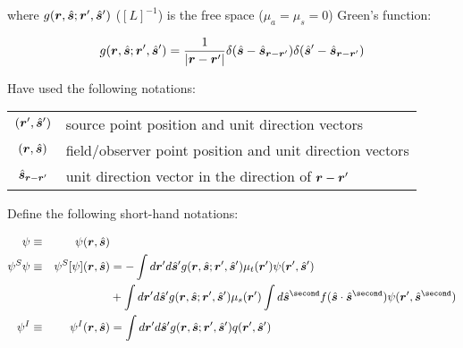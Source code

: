 \documentclass [12pt,letterpaper]{article}
\renewcommand{\vec}{\vectorsym}
\begin{document}
where $g(\vec{r},\hat{\vec{s}};\vec{r}^\prime,\hat{\vec{s}}^\prime)$ ($[L]^{-1}$)
 is the free space ($\mu_a=\mu_s=0$) Green's function:

\begin{equation}\label{eq:2dGF}\begin{split}
g(\vec{r},\hat{\vec{s}};\vec{r}^\prime,\hat{\vec{s}}^\prime)
=
\frac{1}{\vert\vec{r}-\vec{r}^\prime\vert}
\delta(\hat{\vec{s}}-\hat{\vec{s}}_{\vec{r}-\vec{r}^\prime})
\delta(\hat{\vec{s}}^\prime-\hat{\vec{s}}_{\vec{r}-\vec{r}^\prime})
\end{split}\end{equation}

Have used the following notations:

\begin{center}\begin{tabular}{cl}
    $(\vec{r}^\prime,\hat{\vec{s}}^\prime)$&source point position and unit direction vectors \\
    $(\vec{r},\hat{\vec{s}})$&field/observer point position and unit direction vectors \\
    $\hat{\vec{s}}_{\vec{r}-\vec{r}^\prime}$&unit direction vector in the direction of $\vec{r}-\vec{r}^\prime$
\end{tabular}\end{center}

Define the following short-hand notations:

\begin{align}
    \psi&\equiv&\psi(\vec{r},\hat{\vec{s}})& \notag \\
    \psi^S\psi&\equiv&\psi^S[\psi](\vec{r},\hat{\vec{s}})&=
            -\int d\vec{r}^\prime d\hat{\vec{s}}^\prime g(\vec{r},\hat{\vec{s}};\vec{r}^\prime,\hat{\vec{s}}^\prime)
            \mu_t(\vec{r}^\prime)
            \psi(\vec{r}^\prime,\hat{\vec{s}}^\prime) \notag \\
            &&&+\int d\vec{r}^\prime d\hat{\vec{s}}^\prime g(\vec{r},\hat{\vec{s}};\vec{r}^\prime,\hat{\vec{s}}^\prime)
            \mu_s(\vec{r}^\prime)\int d\hat{\vec{s}}^{\second}
            f(\hat{\vec{s}}\cdot\hat{\vec{s}}^{\second})
            \psi(\vec{r}^\prime,\hat{\vec{s}}^{\second}) \label{eq:def-psiS} \\
    \psi^I&\equiv&\psi^I(\vec{r},\hat{\vec{s}})&=
            \int d\vec{r}^\prime d\hat{\vec{s}}^\prime
            g(\vec{r},\hat{\vec{s}};\vec{r}^\prime,\hat{\vec{s}}^\prime)
            q(\vec{r}^\prime,\hat{\vec{s}}^\prime) \label{eq:def-psiI}
\end{align}
\end{document}
